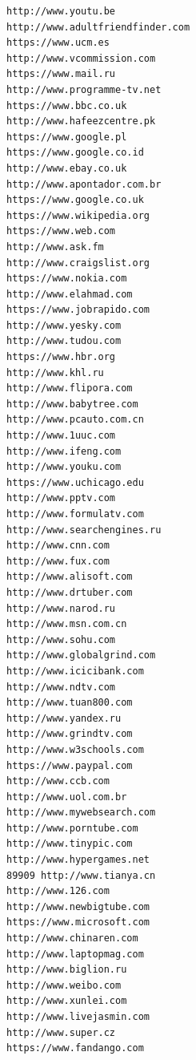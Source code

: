 \documentclass[10pt,letterpaper,notitlepage]{article}
\begin{document}
\begin{multicols}{4}
\begin{verbatim}
http://www.youtu.be
http://www.adultfriendfinder.com
https://www.ucm.es
http://www.vcommission.com
https://www.mail.ru
http://www.programme-tv.net
https://www.bbc.co.uk
http://www.hafeezcentre.pk
https://www.google.pl
https://www.google.co.id
http://www.ebay.co.uk
http://www.apontador.com.br
https://www.google.co.uk
https://www.wikipedia.org
https://www.web.com
http://www.ask.fm
http://www.craigslist.org
https://www.nokia.com
http://www.elahmad.com
https://www.jobrapido.com
http://www.yesky.com
http://www.tudou.com
https://www.hbr.org
http://www.khl.ru
http://www.flipora.com
http://www.babytree.com
http://www.pcauto.com.cn
http://www.1uuc.com
http://www.ifeng.com
http://www.youku.com
https://www.uchicago.edu
http://www.pptv.com
http://www.formulatv.com
http://www.searchengines.ru
http://www.cnn.com
http://www.fux.com
http://www.alisoft.com
http://www.drtuber.com
http://www.narod.ru
http://www.msn.com.cn
http://www.sohu.com
http://www.globalgrind.com
http://www.icicibank.com
http://www.ndtv.com
http://www.tuan800.com
http://www.yandex.ru
http://www.grindtv.com
http://www.w3schools.com
https://www.paypal.com
http://www.ccb.com
http://www.uol.com.br
http://www.mywebsearch.com
http://www.porntube.com
http://www.tinypic.com
http://www.hypergames.net
89909 http://www.tianya.cn
http://www.126.com
http://www.newbigtube.com
https://www.microsoft.com
http://www.chinaren.com
http://www.laptopmag.com
http://www.biglion.ru
http://www.weibo.com
http://www.xunlei.com
http://www.livejasmin.com
http://www.super.cz
https://www.fandango.com
\end{verbatim}
\end{multicols}
\end{document}
